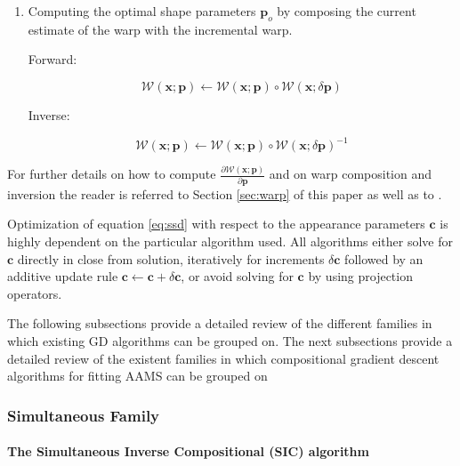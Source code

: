 \begin{enumerate}
\item Computing the optimal shape parameters $\mathbf{p}_o$ by composing the current estimate of the warp with the incremental warp.

Forward:

\begin{equation}
\mathcal{W}(\mathbf{x}; \mathbf{p}) \leftarrow \mathcal{W}(\mathbf{x}; \mathbf{p}) \circ \mathcal{W}(\mathbf{x}; \delta \mathbf{p}) 
\end{equation}

Inverse:

\begin{equation}
\mathcal{W}(\mathbf{x}; \mathbf{p}) \leftarrow \mathcal{W}(\mathbf{x}; \mathbf{p}) \circ \mathcal{W}(\mathbf{x}; \delta \mathbf{p})^{-1} 
\end{equation}


\end{enumerate}

For further details on how to compute $\frac{\partial \mathcal{W}(\mathbf{x}; \mathbf{p})}{\partial \mathbf{p}}$ and on warp composition and inversion the reader is referred to Section \ref{sec:warp} of this paper as well as to \cite{}.

Optimization of equation \ref{eq:ssd} with respect to the appearance parameters $\mathbf{c}$ is highly dependent on the particular algorithm used. All algorithms either solve for $\mathbf{c}$ directly in close from solution, iteratively for increments $\delta \mathbf{c}$ followed by an additive update rule $\mathbf{c} \leftarrow \mathbf{c} + \delta \mathbf{c}$, or avoid solving for $\mathbf{c}$ by using projection operators.

The following subsections provide a detailed review of the different families in which existing GD algorithms can be grouped on.
The next subsections provide a detailed review of the existent families in which compositional gradient descent algorithms for fitting AAMS can be grouped on


\subsubsection{Simultaneous Family}


\paragraph{The Simultaneous Inverse Compositional (SIC) algorithm}


